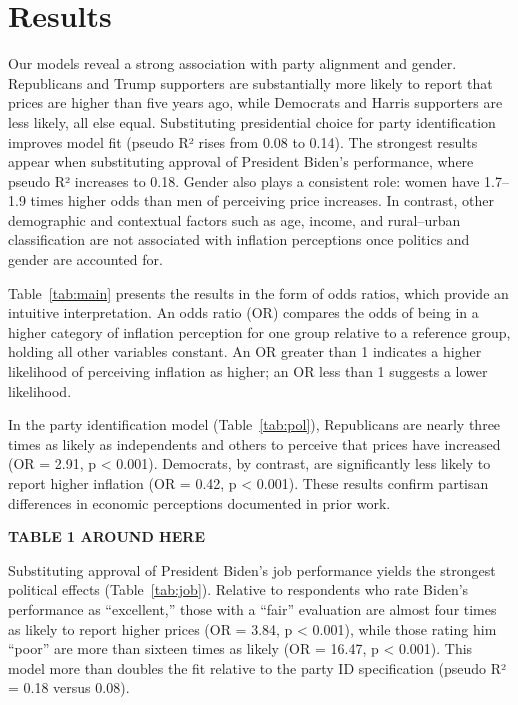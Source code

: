 \documentclass[preprint,12pt,authoryear]{elsarticle}
\begin{document}
\section{Results}
Our models reveal a strong association with party alignment and gender. Republicans and Trump supporters are substantially more likely to report that prices are higher than five years ago, while Democrats and Harris supporters are less likely, all else equal. Substituting presidential choice for party identification improves model fit (pseudo R² rises from 0.08 to 0.14). The strongest results appear when substituting approval of President Biden’s performance, where pseudo R² increases to 0.18. Gender also plays a consistent role: women have 1.7–1.9 times higher odds than men of perceiving price increases. In contrast, other demographic and contextual factors such as age, income, and rural–urban classification are not associated with inflation perceptions once politics and gender are accounted for.

Table~\ref{tab:main} presents the results in the form of odds ratios, which provide an intuitive interpretation. An odds ratio (OR) compares the odds of being in a higher category of inflation perception for one group relative to a reference group, holding all other variables constant. An OR greater than 1 indicates a higher likelihood of perceiving inflation as higher; an OR less than 1 suggests a lower likelihood.

In the party identification model (Table~\ref{tab:pol}), Republicans are nearly three times as likely as independents and others to perceive that prices have increased (OR = 2.91, p < 0.001). Democrats, by contrast, are significantly less likely to report higher inflation (OR = 0.42, p < 0.001). These results confirm partisan differences in economic perceptions documented in prior work.

\begin{center}
\textbf{TABLE 1 AROUND HERE}
\end{center}

Substituting approval of President Biden’s job performance yields the strongest political effects (Table~\ref{tab:job}). Relative to respondents who rate Biden’s performance as “excellent,” those with a “fair” evaluation are almost four times as likely to report higher prices (OR = 3.84, p < 0.001), while those rating him “poor” are more than sixteen times as likely (OR = 16.47, p < 0.001). This model more than doubles the fit relative to the party ID specification (pseudo R² = 0.18 versus 0.08).
\end{document}

